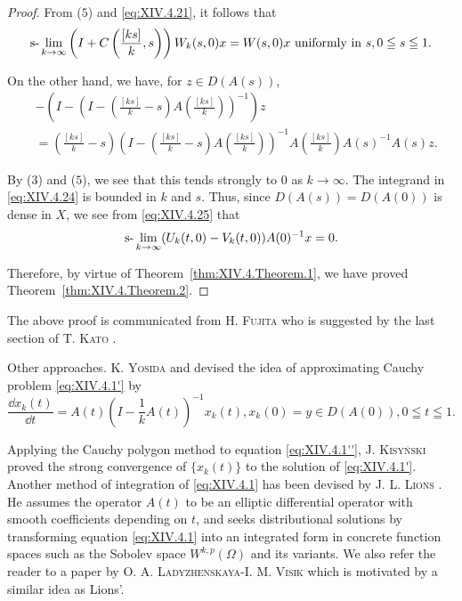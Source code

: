\begin{proof}
From ($5$) and \eqref{eq:XIV.4.21}, it follows that 
\[
\text{s-}\lim _{k \rightarrow \infty} \left(I + C \left(\frac {[ k s ]}{k}, s\right)\right) W _{k} (s, 0) x = W (s, 0) x \text{ uniformly in } s, 0 \leqq s \leqq 1.
\]

On the other hand, we have, for $z \in D(A(s))$, 
\begin{equation}\label{eq:XIV.4.25}
\begin{aligned} & - \left(I - \left(I - \left(\frac {[ k s ]}{k} - s\right) A \left(\frac {[ k s ]}{k}\right)\right) ^{-1}\right) z \\ & = \left(\frac {[ k s ]}{k} - s\right) \left(I - \left(\frac {[ k s ]}{k} - s\right) A \left(\frac {[ k s ]}{k}\right)\right) ^{-1} A \left(\frac {[ k s ]}{k}\right) A (s) ^{-1} A (s) z. \end{aligned}
\end{equation}

By ($3$) and ($5$), we see that this tends strongly to $0$ as $k \to \infty$. The integrand in \eqref{eq:XIV.4.24} is bounded in $k$ and $s$. Thus, since $D(A(s)) = D(A(0))$ is dense in $X$, we see from \eqref{eq:XIV.4.25} that 
\[
\text{s-}\lim _{k \to \infty} (U _{k} (t, 0) - V _{k} (t, 0)) A (0) ^{-1} x = 0.
\]

Therefore, by virtue of Theorem~\ref{thm:XIV.4.Theorem.1}, we have proved Theorem~\ref{thm:XIV.4.Theorem.2}. 
\end{proof}

\begin{remarku} The above proof is communicated from H. \textsc{Fujita} who is suggested by the last section of T. \textsc{Kato} \cite{kato143}. 
\end{remarku}

Other approaches. K. \textsc{Yosida} \cite{yosida366} and \cite{yosida371} devised the idea of approximating Cauchy problem \eqref{eq:XIV.4.1'} by 
\begin{equation}\tag{1''}\label{eq:XIV.4.1''}
\frac {\dd x _{k} (t)}{\dd t} = A (t) \left(I - \frac {1}{k} A (t)\right) ^{-1} x _{k} (t), x _{k} (0) = y \in D (A (0)), 0 \leqq t \leqq 1.
\end{equation}

Applying the Cauchy polygon method to equation \eqref{eq:XIV.4.1''}, J. \textsc{Kisyński} \cite{kisynski150} proved the strong convergence of $\{x_{k}(t)\}$ to the solution of \eqref{eq:XIV.4.1'}. Another method of integration of \eqref{eq:XIV.4.1} has been devised by J. L. \textsc{Lions} \cite{liggett179}. He assumes the operator $A(t)$ to be an elliptic differential operator with smooth coefficients depending on $t$, and seeks distributional solutions by transforming equation \eqref{eq:XIV.4.1} into an integrated form in concrete function spaces such as the Sobolev space $W^{k,p}(\Omega)$ and its variants. We also refer the reader to a paper by O. A. \textsc{Ladyzhenskaya}-I. M. \textsc{Visik} \cite{ladyzhenskaya170} which is motivated by a similar idea as Lions'. 


